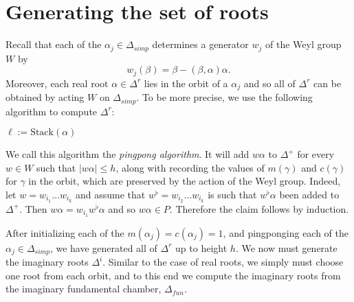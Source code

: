 \documentclass[12pt]{report}
\newcommand{\dfn}[1]{\emph{#1}\index{#1}}
\theoremstyle{definition}
\begin{document}
\section{Generating the set of roots}
Recall that each of the $\alpha_j \in \Delta_{simp}$ determines a generator $w_j$ of the Weyl group $W$ by
$$w_j(\beta) = \beta - ( \beta, \alpha) \alpha.$$
Moreover, each real root $\alpha \in \Delta^r$ lies in the orbit of a $\alpha_j$ and so all of $\Delta^r$ can be obtained by acting $W$ on $\Delta_{simp}$. To be more precise, we use the following algorithm to compute $\Delta^r$:
\begin{algorithm}[H]
	$\ell := \text{Stack}(\alpha)$\;
\end{algorithm}
We call this algorithm the \dfn{pingpong algorithm}. It will add $w\alpha$ to $\Delta^+$ for every $w \in W$ such that $|w\alpha| \leq h$, along with recording the values of $m(\gamma)$ and $c(\gamma)$ for $\gamma$ in the orbit, which are preserved by the action of the Weyl group. Indeed, let $w = w_{i_1} \dots w_{i_k}$ and assume that $w^\flat = w_{i_2} \dots w_{i_k}$ is such that $w^\flat \alpha$ been added to $\Delta^+$. Then $w\alpha = w_{i_1}w^\flat \alpha$ and so $w\alpha \in P$. Therefore the claim follows by induction.

After initializing each of the $m(\alpha_j) = c(\alpha_j) = 1$, and pingponging each of the $\alpha_j \in \Delta_{simp}$, we have generated all of $\Delta^r$ up to height $h$. We now must generate the imaginary roots $\Delta^i$. Similar to the case of real roots, we simply must choose one root from each orbit, and to this end we compute the imaginary roots from the imaginary fundamental chamber, $\Delta_{fun}$.
\end{document}
